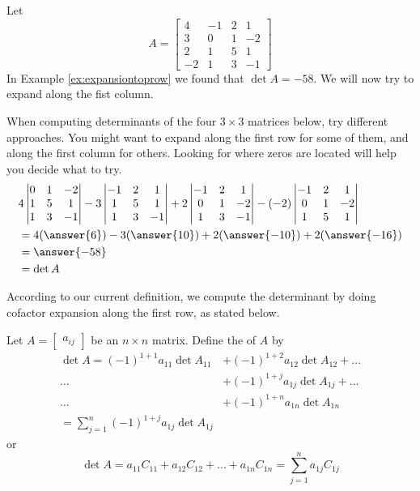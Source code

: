 \documentclass{ximera}
\begin{document}
\begin{exploration}\label{init:expansionfirstcol2}
Let
$$A=\begin{bmatrix}4&-1&2&1\\3&0&1&-2\\
2&1&5&1\\-2&1&3&-1\end{bmatrix}$$
In Example \ref{ex:expansiontoprow} we found that $\det{A}=-58$.  We will now try to expand along the fist column.  

When computing determinants of the four $3\times 3$ matrices below, try different approaches.  You might want to expand along the first row for some of them, and along the first column for others.  Looking for where zeros are located will help you decide what to try.
\begin{align*}
&4\begin{vmatrix}0&1&-2\\1&5&1\\1&3&-1\end{vmatrix}-3\begin{vmatrix}-1&2&1\\1&5&1\\1&3&-1\end{vmatrix}+2\begin{vmatrix}-1&2&1\\0&1&-2\\1&3&-1\end{vmatrix}-(-2)\begin{vmatrix}-1&2&1\\0&1&-2\\1&5&1\end{vmatrix}\\
&=4(\answer{6})-3(\answer{10})+2(\answer{-10})+2(\answer{-16})\\
&=\answer{-58}\\
&=\det{A}
\end{align*}

\end{exploration}

According to our current definition, we compute the determinant by doing cofactor expansion along the first row, as stated below.

\begin{definition}\label{def:toprowexpansion1}  Let $A=\begin{bmatrix}a_{ij}\end{bmatrix}$ be an $n\times n$ matrix.  Define the  of $A$ by
\begin{align*}\det{A}=(-1)^{1+1}a_{11}\det{A_{11}}&+(-1)^{1+2}a_{12}\det{A_{12}}+\ldots \\
\ldots &+(-1)^{1+j}a_{1j}\det{A_{1j}}+\ldots \\
\ldots &+(-1)^{1+n}a_{1n}\det{A_{1n}}\\
=\sum_{j=1}^n(-1)^{1+j}a_{1j}\det{A_{1j}}
\end{align*}
or
$$\det{A}=a_{11}C_{11}+a_{12}C_{12}+\ldots +a_{1n}C_{1n}=\sum_{j=1}^n a_{1j}C_{1j}$$
\end{definition}
\end{document}
